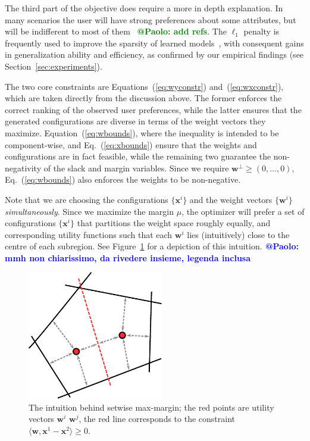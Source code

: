 \documentclass{article}
\renewcommand\[{\begin{equation}}
\renewcommand\]{\end{equation}}
\newcommand{\vecvar}[1]{\ensuremath{\boldsymbol{#1}}}
\newcommand{\vw}{\vecvar{w}}
\newcommand{\vx}{\vecvar{x}}
\newcommand{\andrea}[1]{{\bf \textcolor{blue}{{\fbox{Andrea:} #1}}}}
\newcommand{\stefano}[1]{{\bf \textcolor{green}{{\fbox{Stefano:} #1}}}}
\begin{document}
The third part of the objective does require a more in depth explanation. In
many scenarios the user will have strong preferences about some attributes, but
will be indifferent to most of them~\cite{} \stefano{@Paolo: add refs}. The $\ell_1$ penalty is frequently
used to improve the sparsity of learned models~\cite{lasso,zhang2008,Hensinger2010}, with consequent gains
in generalization ability and efficiency, as confirmed by our empirical
findings (see Section~\ref{sec:experiments}).

The two core constraints are Equations~(\ref{eq:wyconstr}) and~(\ref{eq:wxconstr}),
which are taken directly from the discussion above. The former enforces the
correct ranking of the observed user preferences, while the latter ensures that
the generated configurations are diverse in terms of the weight vectors they
maximize. Equation~(\ref{eq:wbounds}), where the inequality is intended to be component-wise, and Eq.~(\ref{eq:xbounds})
ensure that the weights and configurations are in fact feasible, while the
remaining two guarantee the non-negativity of the slack and margin variables.
Since we require $\vw^\bot \ge (0,\ldots,0)$, Eq.~(\ref{eq:wbounds}) also enforces the weights to be non-negative.

Note that we are choosing the configurations $\{ \vx^i \}$ and the weight vectors $\{
\vw^i \}$ {\em simultaneously}. Since we maximize the margin $\mu$, the optimizer
will prefer a set of configurations $\{ \vx^{i} \}$ that partitions the weight space
roughly equally, and corresponding utility functions such that each $\vw^{i}$
lies (intuitively) close to the centre of each subregion. See
Figure~\ref{fig:setmargin} for a depiction of this intuition.\andrea{@Paolo: mmh non chiarissimo, da rivedere insieme, legenda inclusa}

\begin{figure}[t]
    \begin{center}
        \includegraphics[width=16em]{figures/setmargin}
    \end{center}
    \caption{\label{fig:setmargin} The intuition behind setwise max-margin; the red points are utility vectors $\vw^{i}$ $\vw^{j}$, the red line corresponds to the constraint $\langle \vw, \vx^{1} - \vx^{2} \rangle \ge 0$.}
\end{figure}
\end{document}
